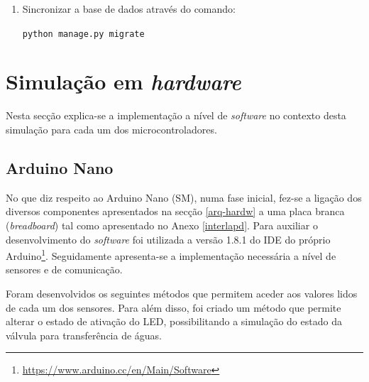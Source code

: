 \begin{enumerate}
	
	\item Sincronizar a base de dados através do comando: 
	
	\texttt{python manage.py migrate}
	 
\end{enumerate}



\section{Simulação em \textit{hardware}}

Nesta secção explica-se a implementação a nível de \textit{software} no contexto desta simulação para cada um dos microcontroladores. 


\subsection{Arduino Nano}
\label{arduinonanoard}

No que diz respeito ao Arduino Nano (\acl{SM}), numa fase inicial,  fez-se a ligação dos diversos componentes  apresentados na secção \ref{arq-hardw} a uma placa branca (\textit{breadboard}) tal como apresentado no Anexo \ref{interlapd}. Para auxiliar o desenvolvimento do \textit{software} foi utilizada a versão 1.8.1 do \ac{IDE} do próprio Arduino\footnote{\url{https://www.arduino.cc/en/Main/Software}}. Seguidamente apresenta-se a implementação necessária a nível de sensores e de comunicação. 


Foram desenvolvidos os seguintes métodos que permitem aceder aos valores lidos de cada um dos sensores. Para além disso, foi criado um método que permite alterar o estado de ativação do \ac{LED}, possibilitando a simulação do estado da válvula para transferência de águas. 


